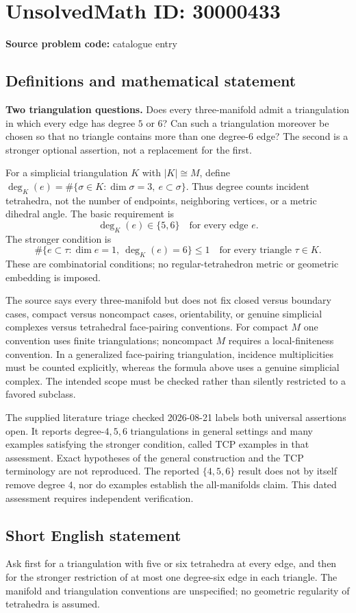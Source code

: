 \documentclass[11pt]{article}
\begin{document}
\section*{UnsolvedMath ID: 30000433}
\textbf{Source problem code:} catalogue entry
\subsection{Definitions and mathematical statement}
\textbf{Two triangulation questions.} Does every three-manifold admit a triangulation in which every edge has degree \(5\) or \(6\)? Can such a triangulation moreover be chosen so that no triangle contains more than one degree-\(6\) edge? The second is a stronger optional assertion, not a replacement for the first.\par For a simplicial triangulation \(K\) with \(|K|\cong M\), define \(\deg_K(e)=\#\{\sigma\in K:\dim\sigma=3,\ e\subset\sigma\}\). Thus degree counts incident tetrahedra, not the number of endpoints, neighboring vertices, or a metric dihedral angle. The basic requirement is\[\deg_K(e)\in\{5,6\}\quad\text{for every edge }e.\] The stronger condition is\[\#\{e\subset\tau:\dim e=1,\ \deg_K(e)=6\}\le1\quad\text{for every triangle }\tau\in K.\] These are combinatorial conditions; no regular-tetrahedron metric or geometric embedding is imposed.\par The source says every three-manifold but does not fix closed versus boundary cases, compact versus noncompact cases, orientability, or genuine simplicial complexes versus tetrahedral face-pairing conventions. For compact \(M\) one convention uses finite triangulations; noncompact \(M\) requires a local-finiteness convention. In a generalized face-pairing triangulation, incidence multiplicities must be counted explicitly, whereas the formula above uses a genuine simplicial complex. The intended scope must be checked rather than silently restricted to a favored subclass.\par The supplied literature triage checked 2026-08-21 labels both universal assertions open. It reports degree-\(4,5,6\) triangulations in general settings and many examples satisfying the stronger condition, called TCP examples in that assessment. Exact hypotheses of the general construction and the TCP terminology are not reproduced. The reported \(\{4,5,6\}\) result does not by itself remove degree \(4\), nor do examples establish the all-manifolds claim. This dated assessment requires independent verification.
\subsection{Short English statement}
Ask first for a triangulation with five or six tetrahedra at every edge, and then for the stronger restriction of at most one degree-six edge in each triangle. The manifold and triangulation conventions are unspecified; no geometric regularity of tetrahedra is assumed.
\end{document}
